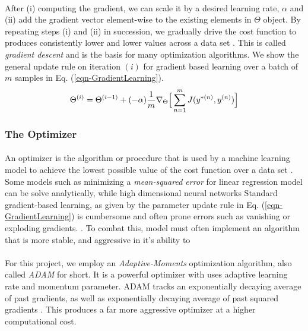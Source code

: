 \documentclass[12pt,letterpaper]{article}
\begin{document}
\paragraph*{}After (i) computing the gradient, we can scale it by a desired learning rate, $\alpha$ and (ii) add the gradient vector element-wise to the existing elements in $\Theta$ object. By repeating steps (i) and (ii) in succession, we gradually drive the cost function to produces consistently lower and lower values across a data set \cite{Geron}. This is called \textit{gradient descent} and is the basis for many optimization algorithms. We show the general update rule on iteration $(i)$ for gradient based learning over a batch of $m$ samples in Eq. (\ref{eqn-GradientLearning}).
\begin{equation}
\label{eqn-GradientLearning}
\Theta^{(i)} = \Theta^{(i-1)} + (-\alpha)\frac{1}{m} \nabla_{\Theta} \Big[\sum_{n=1}^{m} J(y^{*(n)},y^{(n)}) \Big] \\
\end{equation}





\subsubsection{The Optimizer}

\paragraph*{}An optimizer is the algorithm or procedure that is used by a machine learning model to achieve the lowest possible value of the cost function over a data set \cite{Geron}. Some models such as minimizing a \textit{mean-squared error} for linear regression model can be solve analytically, while high dimensional neural networks
Standard gradient-based learning, as given by the parameter update rule in Eq. (\ref{eqn-GradientLearning}) is cumbersome and often prone errors such as vanishing or exploding gradients. \cite{Geron,Goodfellow,Loy}. To combat this, model must often implement an algorithm that is more stable, and aggressive in it's ability to

\paragraph*{}For this project, we employ an \textit{Adaptive-Moments} optimization algorithm, also called \textit{ADAM} for short. It is a powerful optimizer with uses adaptive learning rate and momentum parameter. ADAM tracks an exponentially decaying average of past gradients, as well as exponentially decaying average of past squared gradients \cite{Geron}. This produces a far more aggressive optimizer at a higher computational cost.
\end{document}

